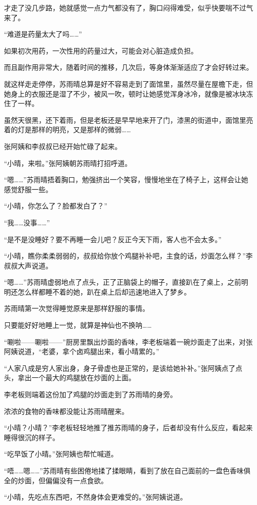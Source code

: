 才走了没几步路，她就感觉一点力气都没有了，胸口闷得难受，似乎快要喘不过气来了。

“难道是药量太大了吗……”

如果初次用药，一次性用的药量过大，可能会对心脏造成负担。

而且副作用非常大，随着时间的推移，几次后，等身体渐渐适应了才会好转过来。

就这样走走停停，苏雨晴总算是好不容易走到了面馆里，虽然尽量在屋檐下走，但她身上的衣服还是湿了不少，被风一吹，顿时让她感觉浑身冰冷，就像是被冰块冻住了一样。

虽然天很黑，还下着雨，但是老板还是早早地来开了门，漆黑的街道中，面馆里亮着的灯是那样的明亮，又是那样的微弱……

张阿姨和李叔叔已经开始忙碌了起来。

“小晴，来啦。”张阿姨朝苏雨晴打招呼道。

“嗯……”苏雨晴捂着胸口，勉强挤出一个笑容，慢慢地坐在了椅子上，这样会让她感觉舒服一些。

“小晴，你怎么了？脸都发白了？”

“我……没事……”

“是不是没睡好？要不再睡一会儿吧？反正今天下雨，客人也不会太多。”

“小晴，瞧你柔柔弱弱的，叔叔给你放个鸡腿补补吧，主食的话，炒面怎么样？”李叔叔大声说道。

“嗯……”苏雨晴虚弱地点了点头，正了正脑袋上的帽子，直接趴在了桌上，之前明明还怎么样都睡不着的她，趴在桌上后却迅速地进入了梦乡。

苏雨晴第一次觉得睡觉原来是那样舒服的事情。

只要能好好地睡上一觉，就算是神仙也不换呐……

“唰啦——唰啦——”厨房里飘出炒面的香味，李老板端着一碗炒面走了出来，对张阿姨说道，“老婆，拿个卤鸡腿出来，看小晴累的。”

“人家八成是穷人家出身，身子骨虚也是正常的，是该给她补补。”张阿姨点了点头，拿出一个最大的鸡腿放在炒面的上面。

李老板则端着这份加了鸡腿的炒面走到了苏雨晴的身旁。

浓浓的食物的香味都没能让苏雨晴醒来。

“小晴？小晴？”李老板轻轻地推了推苏雨晴的身子，后者却没有什么反应，看起来睡得很沉的样子。

“吃早饭了小晴。”张阿姨也帮忙喊道。

“唔……嗯……”苏雨晴有些困倦地揉了揉眼睛，看到了放在自己面前的一盘色香味俱全的炒面，但偏偏没有一点食欲。

“小晴，先吃点东西吧，不然身体会更难受的。”张阿姨说道。

